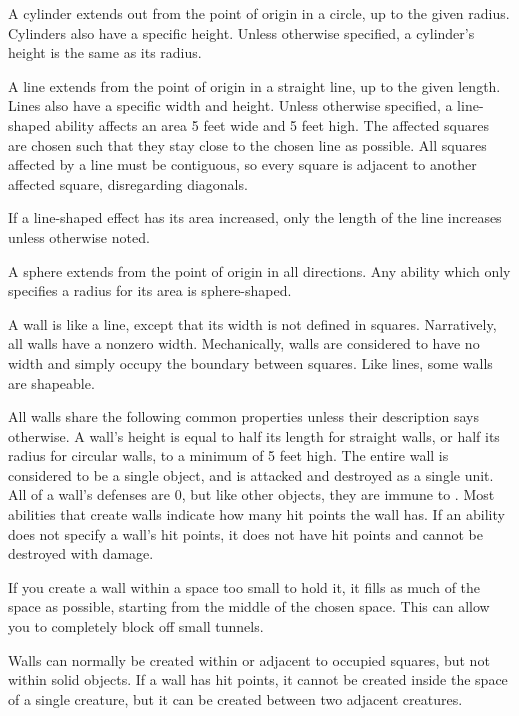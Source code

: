      A cylinder extends out from the point of origin in a circle, up to the given radius.
    Cylinders also have a specific height.
    Unless otherwise specified, a cylinder's height is the same as its radius.

     A line extends from the point of origin in a straight line, up to the given length.
    Lines also have a specific width and height.
    Unless otherwise specified, a line-shaped ability affects an area 5 feet wide and 5 feet high.
    The affected squares are chosen such that they stay close to the chosen line as possible.
    All squares affected by a line must be contiguous, so every square is adjacent to another affected square, disregarding diagonals.

    If a line-shaped effect has its area increased, only the length of the line increases unless otherwise noted.

     A sphere extends from the point of origin in all directions.
    Any ability which only specifies a radius for its area is sphere-shaped.

     A wall is like a line, except that its width is not defined in squares.
    Narratively, all walls have a nonzero width.
    Mechanically, walls are considered to have no width and simply occupy the boundary between squares.
    Like lines, some walls are shapeable.

    All walls share the following common properties unless their description says otherwise.
    A wall's height is equal to half its length for straight walls, or half its radius for circular walls, to a minimum of 5 feet high.
    The entire wall is considered to be a single object, and is attacked and destroyed as a single unit.
    All of a wall's defenses are 0, but like other objects, they are immune to .
    Most abilities that create walls indicate how many hit points the wall has.
    If an ability does not specify a wall's hit points, it does not have hit points and cannot be destroyed with damage.

    If you create a wall within a space too small to hold it, it fills as much of the space as possible, starting from the middle of the chosen space.
    This can allow you to completely block off small tunnels.

    Walls can normally be created within or adjacent to occupied squares, but not within solid objects.
    If a wall has hit points, it cannot be created inside the space of a single creature, but it can be created between two adjacent creatures.

